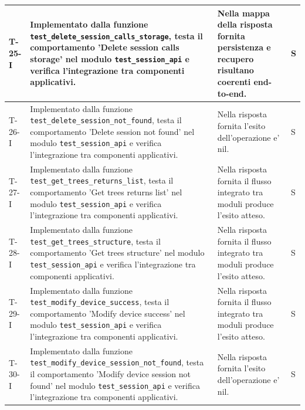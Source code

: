 \documentclass[a4paper,12pt]{article}
\begin{document}
{{\begin{longtable}{|>{\RaggedRight\arraybackslash}p{1.55cm}|>{\RaggedRight\arraybackslash}p{8.0cm}|>{\RaggedRight\arraybackslash}p{4.6cm}|>{\RaggedRight\arraybackslash}p{1.2cm}|}
        \hline
        T-25-I & Implementato dalla funzione \texttt{test\_\allowbreak delete\_\allowbreak session\_\allowbreak calls\_\allowbreak storage}, testa il comportamento 'Delete session calls storage' nel modulo \texttt{test\_\allowbreak session\_\allowbreak api} e verifica l'integrazione tra componenti applicativi. & Nella mappa della risposta fornita persistenza e recupero risultano coerenti end-to-end. & S \\
        \hline
        T-26-I & Implementato dalla funzione \texttt{test\_\allowbreak delete\_\allowbreak session\_\allowbreak not\_\allowbreak found}, testa il comportamento 'Delete session not found' nel modulo \texttt{test\_\allowbreak session\_\allowbreak api} e verifica l'integrazione tra componenti applicativi. & Nella risposta fornita l'esito dell'operazione e' nil. & S \\
        \hline
        T-27-I & Implementato dalla funzione \texttt{test\_\allowbreak get\_\allowbreak trees\_\allowbreak returns\_\allowbreak list}, testa il comportamento 'Get trees returns list' nel modulo \texttt{test\_\allowbreak session\_\allowbreak api} e verifica l'integrazione tra componenti applicativi. & Nella risposta fornita il flusso integrato tra moduli produce l'esito atteso. & S \\
        \hline
        T-28-I & Implementato dalla funzione \texttt{test\_\allowbreak get\_\allowbreak trees\_\allowbreak structure}, testa il comportamento 'Get trees structure' nel modulo \texttt{test\_\allowbreak session\_\allowbreak api} e verifica l'integrazione tra componenti applicativi. & Nella risposta fornita il flusso integrato tra moduli produce l'esito atteso. & S \\
        \hline
        T-29-I & Implementato dalla funzione \texttt{test\_\allowbreak modify\_\allowbreak device\_\allowbreak success}, testa il comportamento 'Modify device success' nel modulo \texttt{test\_\allowbreak session\_\allowbreak api} e verifica l'integrazione tra componenti applicativi. & Nella risposta fornita il flusso integrato tra moduli produce l'esito atteso. & S \\
        \hline
        T-30-I & Implementato dalla funzione \texttt{test\_\allowbreak modify\_\allowbreak device\_\allowbreak session\_\allowbreak not\_\allowbreak found}, testa il comportamento 'Modify device session not found' nel modulo \texttt{test\_\allowbreak session\_\allowbreak api} e verifica l'integrazione tra componenti applicativi. & Nella risposta fornita l'esito dell'operazione e' nil. & S \\

\end{longtable}}}
\end{document}
